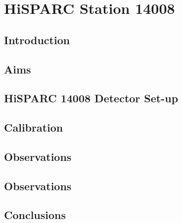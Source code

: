 \chapter{HiSPARC Station 14008}\label{chap:HiSPARC_14008}

\section{Introduction}\label{sec:HS_14008_intro}



\section{Aims}\label{sec:HS_14008_aims}


\section{HiSPARC 14008 Detector Set-up}\label{sec:HiSPARC_14008}


\section{Calibration}\label{sec:HS_properties}


\section{Observations}\label{sec:HS_14008_observations}



\section{Observations}\label{sec:HS_14008_observations}


\section{Conclusions}\label{sec:HS_14008_conclusion}
